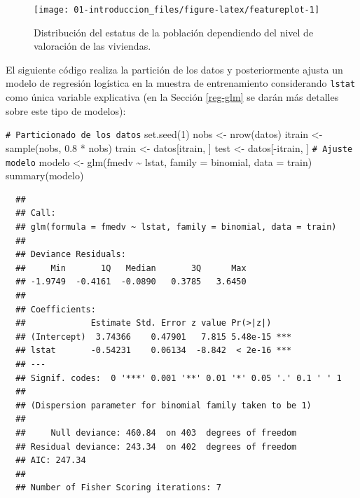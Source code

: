 \documentclass[
]{book}
\newenvironment{Shaded}{\begin{snugshade}}{\end{snugshade}}
\newcommand{\AttributeTok}[1]{\textcolor[rgb]{0.77,0.63,0.00}{#1}}
\newcommand{\CommentTok}[1]{\textcolor[rgb]{0.56,0.35,0.01}{\textit{#1}}}
\newcommand{\DecValTok}[1]{\textcolor[rgb]{0.00,0.00,0.81}{#1}}
\newcommand{\FloatTok}[1]{\textcolor[rgb]{0.00,0.00,0.81}{#1}}
\newcommand{\FunctionTok}[1]{\textcolor[rgb]{0.00,0.00,0.00}{#1}}
\newcommand{\NormalTok}[1]{#1}
\newcommand{\OtherTok}[1]{\textcolor[rgb]{0.56,0.35,0.01}{#1}}
\newcommand{\SpecialCharTok}[1]{\textcolor[rgb]{0.00,0.00,0.00}{#1}}
\theoremstyle{break}
\theoremstyle{nonumberplain}
\renewcommand{\CommentTok}[1]{\textcolor[rgb]{0.41,0.41,0.41}{\texttt{#1}}}
\begin{document}
\begin{figure}[!htb]

{\centering \texttt{[image: 01-introduccion\_files/figure-latex/featureplot-1]} 

}

\caption{Distribución del estatus de la población dependiendo del nivel de valoración de las viviendas.}\label{fig:featureplot}
\end{figure}

El siguiente código realiza la partición de los datos y posteriormente ajusta un modelo de regresión logística en la muestra de entrenamiento considerando \texttt{lstat} como única variable explicativa (en la Sección \ref{reg-glm} se darán más detalles sobre este tipo de modelos):

\begin{Shaded}
\begin{Highlighting}[]
\CommentTok{\# Particionado de los datos}
\FunctionTok{set.seed}\NormalTok{(}\DecValTok{1}\NormalTok{)}
\NormalTok{nobs }\OtherTok{\textless{}{-}} \FunctionTok{nrow}\NormalTok{(datos)}
\NormalTok{itrain }\OtherTok{\textless{}{-}} \FunctionTok{sample}\NormalTok{(nobs, }\FloatTok{0.8} \SpecialCharTok{*}\NormalTok{ nobs)}
\NormalTok{train }\OtherTok{\textless{}{-}}\NormalTok{ datos[itrain, ]}
\NormalTok{test }\OtherTok{\textless{}{-}}\NormalTok{ datos[}\SpecialCharTok{{-}}\NormalTok{itrain, ]}
\CommentTok{\# Ajuste modelo}
\NormalTok{modelo }\OtherTok{\textless{}{-}} \FunctionTok{glm}\NormalTok{(fmedv }\SpecialCharTok{\textasciitilde{}}\NormalTok{ lstat, }\AttributeTok{family =}\NormalTok{ binomial, }\AttributeTok{data =}\NormalTok{ train)}
\FunctionTok{summary}\NormalTok{(modelo)}
\end{Highlighting}
\end{Shaded}

\begin{verbatim}
  ## 
  ## Call:
  ## glm(formula = fmedv ~ lstat, family = binomial, data = train)
  ## 
  ## Deviance Residuals: 
  ##     Min       1Q   Median       3Q      Max  
  ## -1.9749  -0.4161  -0.0890   0.3785   3.6450  
  ## 
  ## Coefficients:
  ##             Estimate Std. Error z value Pr(>|z|)    
  ## (Intercept)  3.74366    0.47901   7.815 5.48e-15 ***
  ## lstat       -0.54231    0.06134  -8.842  < 2e-16 ***
  ## ---
  ## Signif. codes:  0 '***' 0.001 '**' 0.01 '*' 0.05 '.' 0.1 ' ' 1
  ## 
  ## (Dispersion parameter for binomial family taken to be 1)
  ## 
  ##     Null deviance: 460.84  on 403  degrees of freedom
  ## Residual deviance: 243.34  on 402  degrees of freedom
  ## AIC: 247.34
  ## 
  ## Number of Fisher Scoring iterations: 7
\end{verbatim}
\end{document}
